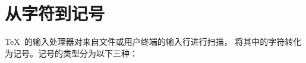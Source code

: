 \documentclass{book}
\begin{document}
\section{从字符到记号}

\TeX\ 的输入处理器对来自文件或用户终端的输入行进行扫描，
将其中的字符转化为记号。记号的类型分为以下三种：
\end{document}
